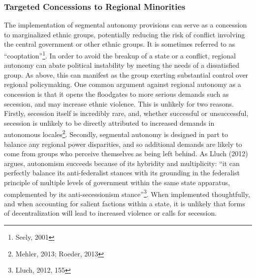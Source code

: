 \documentclass[12pt]{article}
\begin{document}
\subsubsection{Targeted Concessions to Regional Minorities}
The implementation of segmental autonomy provisions can serve as a concession to marginalized ethnic groups, potentially reducing the risk of conflict involving the central government or other ethnic groups. It is sometimes referred to as ``cooptation''\footnote{Seely, 2001}. In order to avoid the breakup of a state or a conflict, regional autonomy can abate political instability by meeting the needs of a dissatisfied group. As above, this can manifest as the group exerting substantial control over regional policymaking. One common argument against regional autonomy as a concession is that it opens the floodgates to more serious demands such as secession, and may increase ethnic violence. This is unlikely for two reasons. Firstly, secession itself is incredibly rare, and, whether successful or unsuccessful, secession is unlikely to be directly attributed to increased demands in autonomous locales\footnote{Mehler, 2013; Roeder, 2013}. Secondly, segmental autonomy is designed in part to balance any regional power disparities, and so additional demands are likely to come from groups who perceive themselves as being left behind. As Lluch (2012) argues, autonomism succeeds because of its hybridity and multiplicity: ``it can perfectly balance its anti-federalist stances with its grounding in the federalist principle of multiple levels of government within the same state apparatus, complemented by its anti-secessionism stance''\footnote{Lluch, 2012, 155}. When implemented thoughtfully, and when accounting for salient factions within a state, it is unlikely that forms of decentralization will lead to increased violence or calls for secession. 
\end{document}
